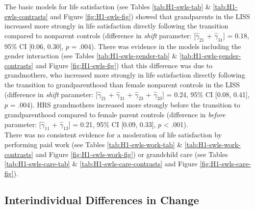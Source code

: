 \documentclass[
  english,
  man, noextraspace]{apa7}
\begin{document}
The basic models for life satisfaction (see Tables \ref{tab:H1-swls-tab} \& \ref{tab:H1-swls-contrasts} and Figure \ref{fig:H1-swls-fig}) showed that grandparents in the LISS increased more strongly in life satisfaction directly following the transition compared to nonparent controls (difference in \emph{shift} parameter: {[}\(\hat{\gamma}_{21}\) + \(\hat{\gamma}_{31}\){]} = 0.18, 95\% CI {[}0.06, 0.30{]}, \(p\) = .004). There was evidence in the models including the gender interaction (see Tables \ref{tab:H1-swls-gender-tab} \& \ref{tab:H1-swls-gender-contrasts} and Figure \ref{fig:H1-swls-fig}) that this difference was due to grandmothers, who increased more strongly in life satisfaction directly following the transition to grandparenthood than female nonparent controls in the LISS (difference in \emph{shift} parameter: {[}\(\hat{\gamma}_{21}\) + \(\hat{\gamma}_{31}\) + \(\hat{\gamma}_{23}\) + \(\hat{\gamma}_{33}\){]} = 0.24, 95\% CI {[}0.08, 0.41{]}, \(p\) = .004). HRS grandmothers increased more strongly before the transition to grandparenthood compared to female parent controls (difference in \emph{before} parameter: {[}\(\hat{\gamma}_{11}\) + \(\hat{\gamma}_{13}\){]} = 0.21, 95\% CI {[}0.09, 0.33{]}, \(p\) \textless{} .001).\\
There was no consistent evidence for a moderation of life satisfaction by performing paid work (see Tables \ref{tab:H1-swls-work-tab} \& \ref{tab:H1-swls-work-contrasts} and Figure \ref{fig:H1-swls-work-fig}) or grandchild care (see Tables \ref{tab:H1-swls-care-tab} \& \ref{tab:H1-swls-care-contrasts} and Figure \ref{fig:H1-swls-care-fig}).

\hypertarget{interindividual-differences-in-change}{%
\subsection{Interindividual Differences in Change}\label{interindividual-differences-in-change}}
\end{document}
